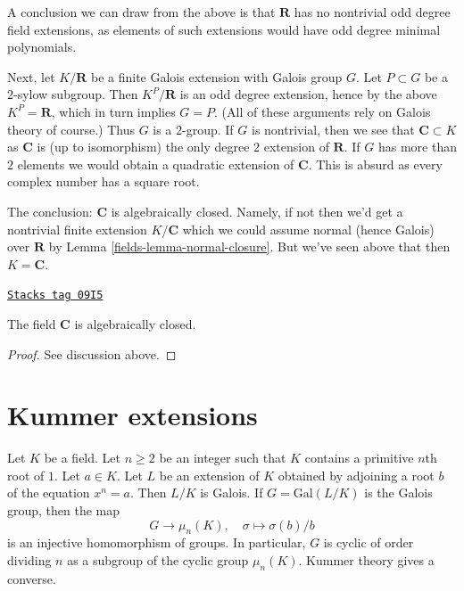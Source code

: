 \medskip\noindent
A conclusion we can draw from the above is that $\mathbf{R}$ has
no nontrivial odd degree field extensions, as elements of such extensions
would have odd degree minimal polynomials.

\medskip\noindent
Next, let $K/\mathbf{R}$ be a finite Galois extension with Galois group $G$.
Let $P \subset G$ be a $2$-sylow subgroup. Then $K^P/\mathbf{R}$ is an
odd degree extension, hence by the above $K^P = \mathbf{R}$,
which in turn implies
$G = P$. (All of these arguments rely on Galois theory of course.)
Thus $G$ is a $2$-group. If $G$ is nontrivial, then we see that
$\mathbf{C} \subset K$ as $\mathbf{C}$ is (up to isomorphism) the only
degree $2$ extension of $\mathbf{R}$. If $G$ has more than $2$ elements
we would obtain a quadratic extension of $\mathbf{C}$.
This is absurd as every complex number has a square root.

\medskip\noindent
The conclusion: $\mathbf{C}$ is algebraically closed. Namely, if not
then we'd get a nontrivial finite extension $K/\mathbf{C}$
which we could assume normal (hence Galois) over $\mathbf{R}$ by
Lemma \ref{fields-lemma-normal-closure}. But we've seen above that then
$K = \mathbf{C}$.

\begin{lemma}

\label{fields-lemma-C-algebraically-closed}
\href{https://stacks.math.columbia.edu/tag/09I5}{\texttt{Stacks tag 09I5}}

The field $\mathbf{C}$ is algebraically closed.
\end{lemma}

\begin{proof}
See discussion above.
\end{proof}

\section{Kummer extensions}
\label{fields-section-Kummer}
Let $K$ be a field. Let $n \geq 2$ be an integer such that $K$ contains
a primitive $n$th root of $1$. Let $a \in K$. Let $L$ be an extension
of $K$ obtained by adjoining a root $b$ of the equation $x^n = a$.
Then $L/K$ is Galois. If $G = \text{Gal}(L/K)$ is the Galois group, then
the map
$$
G \longrightarrow \mu_n(K),\quad \sigma \longmapsto \sigma(b)/b
$$
is an injective homomorphism of groups. In particular, $G$ is cyclic
of order dividing $n$ as a subgroup of the cyclic group $\mu_n(K)$.
Kummer theory gives a converse.

